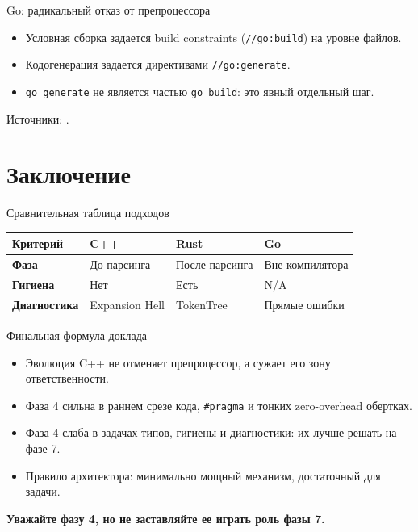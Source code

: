 \documentclass{beamer}
\begin{document}
\begin{frame}[fragile]{Go: радикальный отказ от препроцессора}
\begin{itemize}
        \item Условная сборка задается build constraints (\texttt{//go:build}) на уровне файлов.
        \item Кодогенерация задается директивами \texttt{//go:generate}.
        \item \texttt{go generate} не является частью \texttt{go build}: это явный отдельный шаг.
    \end{itemize}
    \vspace{0.3em}
    Источники: \cite{go_cmd_build_constraints,go_cmd_generate,go_faq_headers}.
\end{frame}

\section{Заключение}

\begin{frame}{Сравнительная таблица подходов}
    \centering
    \small
    \begin{tabular}{p{2cm}p{2.5cm}p{2.5cm}p{2.5cm}}
        \textbf{Критерий} & \textbf{C++} & \textbf{Rust} & \textbf{Go} \\
        \hline
        \textbf{Фаза} & До парсинга & После парсинга & Вне компилятора \\
        \hline
        \textbf{Гигиена} & Нет & Есть & N/A \\
        \hline
        \textbf{Диагностика} & Expansion Hell & TokenTree & Прямые ошибки \\
    \end{tabular}
\end{frame}

\begin{frame}{Финальная формула доклада}
    \begin{itemize}
        \item Эволюция C++ не отменяет препроцессор, а сужает его зону ответственности.
        \item Фаза 4 сильна в раннем срезе кода, \texttt{\#pragma} и тонких zero-overhead обертках.
        \item Фаза 4 слаба в задачах типов, гигиены и диагностики: их лучше решать на фазе 7.
        \item Правило архитектора: минимально мощный механизм, достаточный для задачи.
    \end{itemize}
    \vspace{0.5em}
    \centering \textbf{Уважайте фазу 4, но не заставляйте ее играть роль фазы 7.}
\end{frame}
\end{document}
